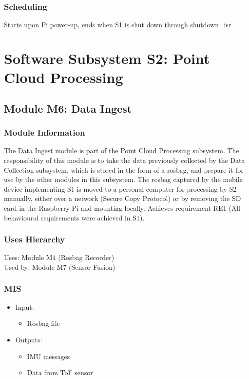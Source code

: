 \documentclass[11pt]{article}
\begin{document}
			\subsubsection{Scheduling}
				Starts upon Pi power-up, ends when S1 is shut down through shutdown\_isr
	\section{Software Subsystem S2: Point Cloud Processing}

		\subsection{Module M6: Data Ingest}
		\label{sec:M4}
			\subsubsection{Module Information}
				The Data Ingest module is part of the Point Cloud Processing subsystem. The responsibility of this module is to take the data previously collected by the Data Collection subsystem, which is stored in the form of a rosbag, and prepare it for use by the other modules in this subsystem. The rosbag captured by the mobile device implementing S1 is moved to a personal computer for processing by S2 manually, either over a network (Secure Copy Protocol) or by removing the SD card in the Raspberry Pi and mounting locally. Achieves requirement RE1 (All behavioural requirements were achieved in S1).
			\subsubsection{Uses Hierarchy}
				Uses: Module M4 (Rosbag Recorder)\\
				Used by: Module M7 (Sensor Fusion) 
			\subsubsection{MIS}
				\begin{itemize}
					\item Input:
						\begin{itemize}
							\item Rosbag file
						\end{itemize} 
					\item Outputs:
						\begin{itemize}
							\item IMU messages 
							\item Data from ToF sensor 
						\end{itemize}
				\end{itemize}
\end{document}
